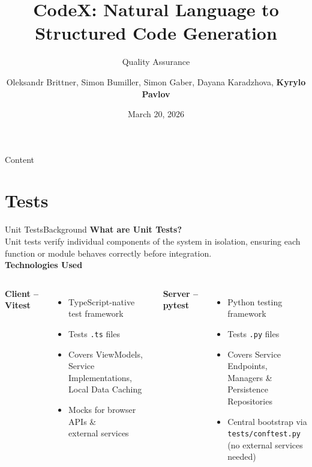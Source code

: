 \documentclass{sdqbeamer}[en]
\title[Quality Assurance]{CodeX: Natural Language to Structured Code Generation}
\subtitle{Quality Assurance}
\author[Pavlov Kyrylo]{Oleksandr Brittner, Simon Bumiller, Simon Gaber, Dayana Karadzhova, \textbf{Kyrylo Pavlov} \newline}
\date[20.\,03.\,2026]{March 20, 2026}
\begin{document}
\begin{frame}[title green horizontal, picture=images/qa_3, kitlogo=white] \titlepage 
\end{frame}
\begin{frame}[tableofcontents=green]{Content}
\tableofcontents
\end{frame}

\section{Tests}

\begin{frame}{Unit Tests}{Background}
  \textbf{What are Unit Tests?}\\[0.5em]
  Unit tests verify individual components of the system in isolation,
  ensuring each function or module behaves correctly before integration.\\[1em]

  \textbf{Technologies Used}
  \begin{columns}
    \textbf{Client -- Vitest}
    \begin{itemize}
      \item TypeScript-native test framework
      \item Tests \texttt{.ts} files
      \item Covers ViewModels, Service\\Implementations, Local Data Caching
      \item Mocks for browser APIs \&\\external services
    \end{itemize}
    \textbf{Server -- pytest}
    \begin{itemize}
      \item Python testing framework
      \item Tests \texttt{.py} files
      \item Covers Service Endpoints,\\Managers \& Persistence Repositories
      \item Central bootstrap via\\
            \texttt{tests/conftest.py}\\
            (no external services needed)
    \end{itemize}
  \end{columns}
\end{frame}
\end{document}
